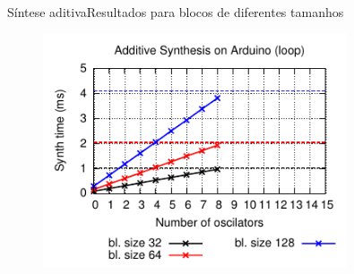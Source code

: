 \begin{frame}{Síntese aditiva}{Resultados para blocos de diferentes tamanhos}
\begin{figure}
\includegraphics[width=0.8\textwidth]{./img/sinesum-comparison-for.pdf}
\end{figure}
\end{frame}


